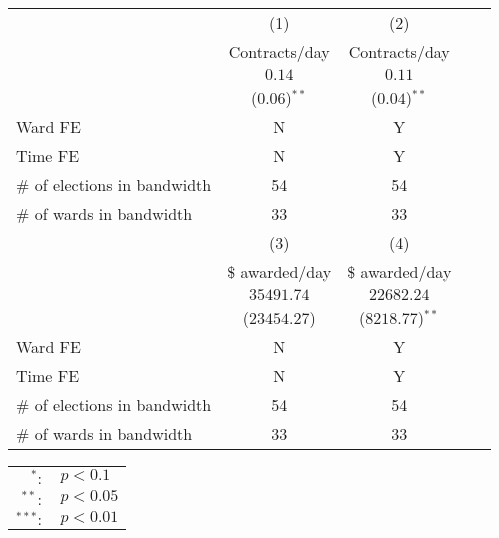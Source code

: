 {\centering
\begin{tabular}{lcccc}
    \toprule
    &(1) & (2)                                                   \\
    & Contracts/day & Contracts/day                              \\ 
    \midrule
    & $\num{0.14}$ & $\num{0.11}$     \\ 
    & ($\num{0.06}$)$^{**}$ & ($\num{0.04}$)$^{**}$ \\   
Ward FE & N & Y                                                    \\
Time FE & N & Y                                                    \\
\# of elections in bandwidth & 54 & 54              \\
\# of wards in bandwidth & 33 & 33                  \\
\toprule
& (3) & (4) \\
& \$ awarded/day & \$ awarded/day\\
\midrule
& $\num{35491.74}$ & $\num{22682.24}$ \\
& ($\num{23454.27}$) & ($\num{8218.77}$)$^{**}$ \\
\midrule
Ward FE & N & Y\\
Time FE & N & Y\\
\# of elections in bandwidth & 54 & 54 \\
\# of wards in bandwidth & 33 & 33 \\
\bottomrule
\end{tabular}
}




\noindent\begin{tabular}{rl}
    $^{*}:$ & $p<0.1$ \\
    $^{**}:$ & $p<0.05$ \\
    $^{***}:$ & $p<0.01$ \\
\end{tabular}
